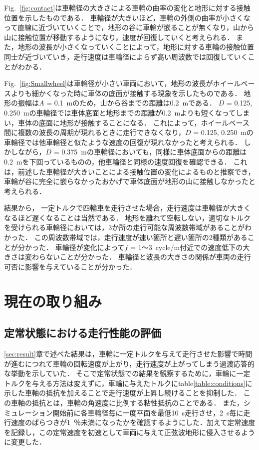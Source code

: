 \documentclass[uplatex,dvipdfmx]{jsarticle}
\begin{document}
Fig.~\ref{fig:contact}は車輪径の大きさによる車輪の曲率の変化と地形に対する接触位置を示したものである．
車輪径が大きいほど，車輪の外側の曲率が小さくなって直線に近づいていくことで，地形の谷に車輪が嵌ることが無くなり，山から山に接触位置が移動するようになり，速度が回復していくと考えられる．
また，地形の波長が小さくなっていくことによって，地形に対する車輪の接触位置同士が近づいていき，走行速度は車輪径によらず高い周波数では回復していくことがわかる．

Fig.~\ref{fig:Smallwheel}は車輪径が小さい車両において，地形の波長がホイールベースよりも細かくなった時に車体の底面が接触する現象を示したものである．
地形の振幅は$A$ = 0.1~mのため，山から谷までの距離は0.2~mである．
$D$ = 0.125, 0.250~mの車輪径では車体底面と地形までの距離が0.2~mよりも短くなってしまい，車体の底面に地形が接触することになる．
これによって，ホイールベース間に複数の波長の周期が現れるときに走行できなくなり，$D$ = 0.125, 0.250~mの車輪径では他車輪径と似たような速度の回復が現れなかったと考えられる．
しかしながら，$D$ = 0.375~mの車輪径においても，同様に車体底面からの距離は0.2~mを下回っているものの，他車輪径と同様の速度回復を確認できる．
これは，前述した車輪径が大きいことによる接触位置の変化によるものと推察でき，車輪が谷に完全に嵌らなかったおかげで車体底面が地形の山に接触しなかったと考えられる．

結果から，
一定トルクで四輪車を走行させた場合，走行速度は車輪径が大きくなるほど遅くなることは当然である．
地形を離れて空転しない，適切なトルクを受けられる車輪径においては，3か所の走行可能な周波数帯域があることがわかった．
この周波数帯域では，走行速度が速い箇所と遅い箇所の2種類があることが分かった．
車輪径が変化によって$f$ = 1～3~cycle/m付近での速度低下の大きさは変わらないことが分かった．
車輪径と波長の大きさの関係が車両の走行可否に影響を与えていることが分かった．

\section{現在の取り組み}
\subsection{定常状態における走行性能の評価}
\ref{sec:result}章で述べた結果は，車輪に一定トルクを与えて走行させた影響で時間が進むにつれて車輪の回転速度が上がり，走行速度が上がってしまう過渡応答的な挙動を示していた．
そこで定常状態での結果を観察するために，車輪に一定トルクを与える方法は変えずに，車輪に与えたトルクにtable\ref{table:conditions}に示した車軸の抵抗を加えることで走行速度が上昇し続けることを抑制した．
この車軸の抵抗とは，車輪の角速度に比例する粘性抵抗のことである．
また，シミュレーション開始前に各車輪径毎に一度平面を最低10~s走行させ，2~s毎に走行速度のばらつきが1~％未満になったかを確認するようにした．加えて定常速度を記録し，この定常速度を初速として車両に与えて正弦波地形に侵入させるように変更した．
\end{document}
